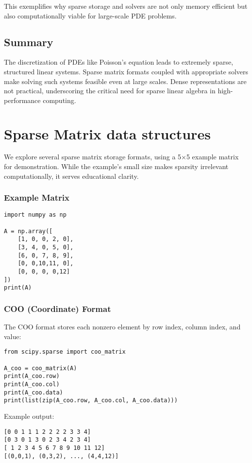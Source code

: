 \documentclass[11pt,a4paper]{book}
\begin{document}
This exemplifies why sparse storage and solvers are not only memory efficient but also computationally viable for large-scale PDE problems.

\section*{Summary}

The discretization of PDEs like Poisson’s equation leads to extremely sparse, structured linear systems. Sparse matrix formats coupled with appropriate solvers make solving such systems feasible even at large scales. Dense representations are not practical, underscoring the critical need for sparse linear algebra in high-performance computing.

\chapter{Sparse Matrix data structures}

We explore several sparse matrix storage formats, using a 5×5 example matrix for demonstration. While the example’s small size makes sparsity irrelevant computationally, it serves educational clarity.

\subsection*{Example Matrix}
\begin{lstlisting}
import numpy as np

A = np.array([
    [1, 0, 0, 2, 0],
    [3, 4, 0, 5, 0],
    [6, 0, 7, 8, 9],
    [0, 0,10,11, 0],
    [0, 0, 0, 0,12]
])
print(A)
\end{lstlisting}

\subsection*{COO (Coordinate) Format}
The COO format stores each nonzero element by row index, column index, and value:

\begin{lstlisting}
from scipy.sparse import coo_matrix

A_coo = coo_matrix(A)
print(A_coo.row)
print(A_coo.col)
print(A_coo.data)
print(list(zip(A_coo.row, A_coo.col, A_coo.data)))
\end{lstlisting}

Example output:
\begin{verbatim}
[0 0 1 1 1 2 2 2 2 3 3 4]
[0 3 0 1 3 0 2 3 4 2 3 4]
[ 1 2 3 4 5 6 7 8 9 10 11 12]
[(0,0,1), (0,3,2), ..., (4,4,12)]
\end{verbatim}
\end{document}
